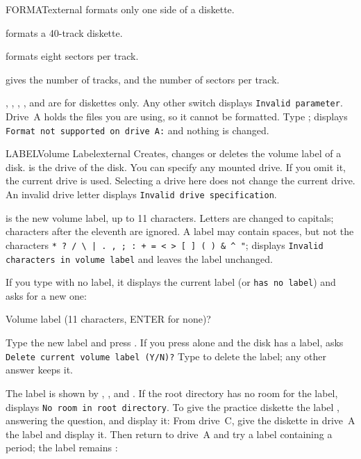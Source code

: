\begin{DosEntry}{FORMAT}{}{external}
 formats only one side of a diskette.

 formats a 40-track diskette.

 formats eight sectors per track.

 gives the number of tracks, and  the number of sectors
per track.

, , , ,  and  are for
diskettes only.  Any other switch displays \texttt{Invalid parameter}.
\Example
Drive~A holds the files you are using, so it cannot be formatted.  Type
;  displays \texttt{Format not supported on
drive A:} and nothing is changed.
\end{DosEntry}

\begin{DosEntry}{LABEL}{Volume Label}{external}
\Purpose Creates, changes or deletes the volume label of a disk.
\Format {}
\Remarks
{} is the drive of the disk.  You can specify any mounted drive.
If you omit it, the current drive is used.  Selecting a drive here does
not change the current drive.  An invalid drive letter displays
\texttt{Invalid drive specification}.

 is the new volume label, up to 11 characters.  Letters are
changed to capitals; characters after the eleventh are ignored.  A label
may contain spaces, but not the characters
\texttt{* ? / \textbackslash{} | . , ; : + = < > [ ] ( ) \& \textasciicircum{} "};
 displays \texttt{Invalid characters in volume label} and
leaves the label unchanged.

If you type  with no label, it displays the current label (or
\texttt{has no label}) and asks for a new one:
\begin{TypeIn}
Volume label (11 characters, ENTER for none)?
\end{TypeIn}
Type the new label and press .  If you press  alone
and the disk has a label,  asks
\texttt{Delete current volume label (Y/N)?}  Type  to delete the
label; any other answer keeps it.

The label is shown by , ,  and .
If the root directory has no room for the label,  displays
\texttt{No room in root directory}.
\Example
To give the practice diskette the label , answering the
question, and display it:
From drive~C, give the diskette in drive~A the label  and
display it.  Then return to drive~A and try a label containing a period;
the label remains :
\end{DosEntry}

